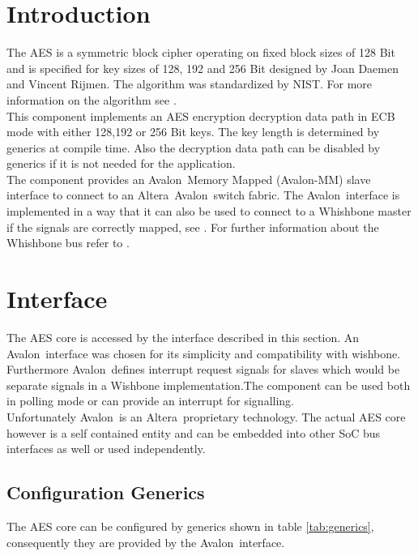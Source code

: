 \documentclass{ruschidoc}
\begin{document}
\maketitle
\newpage
\tableofcontents
\newpage

\section{Introduction}
\label{sec:intro} The \gls{AES} is a symmetric block cipher operating on fixed block sizes
of 128 Bit and is specified for key sizes of 128, 192 and 256 Bit designed by Joan
Daemen and Vincent Rijmen. The algorithm was standardized by \gls{NIST}. For more
information on the algorithm see \cite{NIST:Fips197}.\\
This component implements an AES encryption decryption data path in \gls{ECB} mode with
either 128,192 or 256 Bit keys.  The key length is determined by generics at compile
time. Also the decryption data path can be disabled by generics if it is not needed
for the application.\\
The component provides an Avalon\rtm\ Memory Mapped (Avalon-MM) slave interface to
connect to an Altera\rtm\ Avalon\rtm\ switch fabric. The Avalon\rtm\ interface is
implemented in a way that it can also be used to connect to a Whishbone master if the
signals are correctly mapped, see \cite{Wiki:AvWb}. For further information about the 
Whishbone bus refer to \cite{OC:WBspec}. \\

\section{Interface}
\label{sec:interface}
The AES core is accessed by the interface described in this section. An Avalon\rtm\
interface was chosen for its simplicity and compatibility with wishbone.  Furthermore
Avalon\rtm\ defines interrupt request signals for slaves which would be separate
signals in a Wishbone implementation.The component can be used both in polling 
mode or can provide an interrupt for signalling. \\
Unfortunately Avalon\rtm\ is an Altera\rtm\ proprietary technology. The actual AES
core however is a self contained entity and can be embedded into other \gls{SoC} bus
interfaces as well or used independently.

\subsection{Configuration Generics}
\label{sec:generics}
The AES core can be configured by generics shown in table \ref{tab:generics},
consequently they are provided by the Avalon\rtm\ interface.
\end{document}
